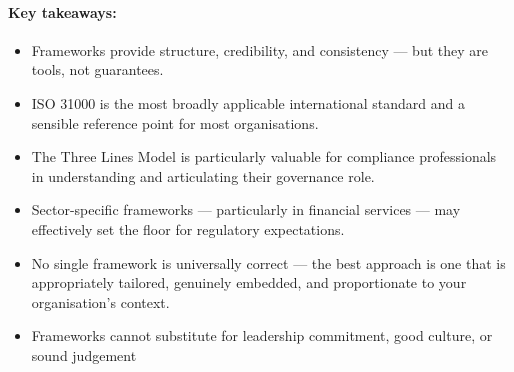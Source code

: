 \paragraph{Key takeaways:}
\begin{itemize}
  \item{Frameworks provide structure, credibility, and consistency — but they are tools, not guarantees.}
  \item{ISO 31000 is the most broadly applicable international standard and a sensible reference point for most organisations.}
  \item{The Three Lines Model is particularly valuable for compliance professionals in understanding and articulating their governance role.}
  \item{Sector-specific frameworks — particularly in financial services — may effectively set the floor for regulatory expectations.}
  \item{No single framework is universally correct — the best approach is one that is appropriately tailored, genuinely embedded, and proportionate to your organisation's context.}
  \item{Frameworks cannot substitute for leadership commitment, good culture, or sound judgement}
\end{itemize}

